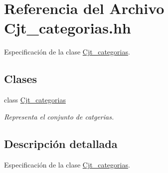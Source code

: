 \hypertarget{_cjt__categorias_8hh}{}\section{Referencia del Archivo Cjt\+\_\+categorias.\+hh}
\label{_cjt__categorias_8hh}


Especificación de la clase \hyperlink{class_cjt__categorias}{Cjt\+\_\+categorias}.  


\subsection*{Clases}
\begin{DoxyCompactItemize}
\item 
class \hyperlink{class_cjt__categorias}{Cjt\+\_\+categorias}
\begin{DoxyCompactList}\small\item\em Representa el conjunto de catgerias. \end{DoxyCompactList}\end{DoxyCompactItemize}


\subsection{Descripción detallada}
Especificación de la clase \hyperlink{class_cjt__categorias}{Cjt\+\_\+categorias}. 

